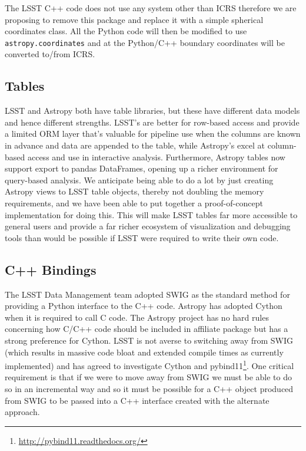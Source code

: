 \documentclass[]{spie}  %
\begin{document}
The LSST C++ code does not use any system other than ICRS therefore we are proposing to remove this package and replace it with a simple spherical coordinates class.
All the Python code will then be modified to use \texttt{astropy.coordinates} and at the Python/C++ boundary coordinates will be converted to/from ICRS.

\subsection{Tables}

LSST and Astropy both have table libraries, but these have different data models and hence different strengths.
LSST's are better for row-based access and provide a limited ORM layer that's valuable for pipeline use when the columns are known in advance and data are appended to the table, while Astropy's excel at column-based access and use in interactive analysis.
Furthermore, Astropy tables now support export to pandas DataFrames\cite{mckinney-proc-scipy-2010}, opening up a richer environment for query-based analysis.
We anticipate being able to do a lot by just creating Astropy views to LSST table objects, thereby not doubling the memory requirements, and we have been able to put together a proof-of-concept implementation for doing this.
This will make LSST tables far more accessible to general users and provide a far richer ecosystem of visualization and debugging tools than would be possible if LSST were required to write their own code.

\subsection{C++ Bindings}

The LSST Data Management team adopted SWIG as the standard method for providing a Python interface to the C++ code.
Astropy has adopted Cython\cite{2010/content/aip/journal/cise/13/2/10.1109/MCSE.2010.118} when it is required to call C code.
The Astropy project has no hard rules concerning how C/C++ code should be included in affiliate package but has a strong preference for Cython.
LSST is not averse to switching away from SWIG (which results in massive code bloat and extended compile times as currently implemented) and has agreed to investigate Cython\cite{dmtn-013} and pybind11\cite{dmtn-014}\footnote{\url{http://pybind11.readthedocs.org/}}.
One critical requirement is that if we were to move away from SWIG we must be able to do so in an incremental way and so it must be possible for a C++ object produced from SWIG to be passed into a C++ interface created with the alternate approach.
\end{document}
